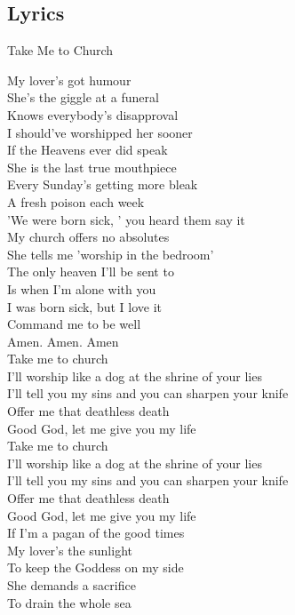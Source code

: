 \documentclass[compress]{beamer}
\begin{document}
\subsection{Lyrics}
\begin{frame}[allowframebreaks]{Take Me to Church}
\begin{center}
My lover's got humour \\
She's the giggle at a funeral \\
Knows everybody's disapproval \\
I should've worshipped her sooner \\
If the Heavens ever did speak \\
She is the last true mouthpiece \\
Every Sunday's getting more bleak \\
A fresh poison each week \\
'We were born sick, ' you heard them say it \\
My church offers no absolutes \\
She tells me 'worship in the bedroom' \\
The only heaven I'll be sent to \\
Is when I'm alone with you \\
I was born sick, but I love it \\
Command me to be well \\
Amen. Amen. Amen \\
Take me to church \\
I'll worship like a dog at the shrine of your lies \\
I'll tell you my sins and you can sharpen your knife \\
Offer me that deathless death \\
Good God, let me give you my life  \\
Take me to church  \\
I'll worship like a dog at the shrine of your lies  \\
I'll tell you my sins and you can sharpen your knife  \\
Offer me that deathless death  \\
Good God, let me give you my life  \\
If I'm a pagan of the good times  \\
My lover's the sunlight  \\
To keep the Goddess on my side  \\
She demands a sacrifice \\
To drain the whole sea \\

\end{center}
\end{frame}
\end{document}
